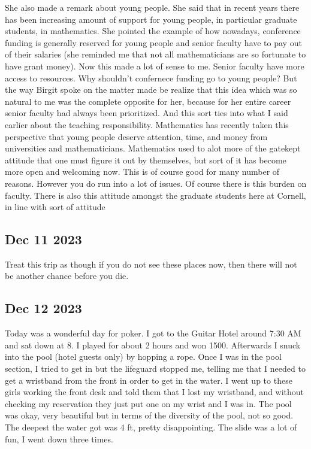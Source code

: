 \documentclass[12pt]{article}
\begin{document}
She also made a remark about young people. She said that in recent years there has been increasing amount of support for young people, in particular graduate students, in mathematics. She pointed the example
of how nowadays, conference funding is generally reserved for young people and senior faculty have to pay out of their salaries (she reminded me that not all mathematicians are so fortunate to have grant money).
Now this made a lot of sense to me. Senior faculty have more access to resources. Why shouldn't confernece funding go to young people? But the way Birgit spoke on the matter made be realize that this idea which
was so natural to me was the complete opposite for her, because for her entire career senior faculty had always been prioritized. And this sort ties into what I said earlier about the teaching responsibility.
Mathematics has recently taken this perspective that young people deserve attention, time, and money from universities and mathematicians. 
Mathematics used to alot more of the gatekept attitude that one must figure it out by themselves, but sort of it has become more open and welcoming now.
This is of course good for many number of reasons. However you do run into a lot of issues. Of course there is this burden on faculty. 
There is also this attitude amongst the graduate students here at Cornell, in line with sort of attitude
\subsection{Dec 11 2023}
Treat this trip as though if you do not see these places now, then there will not be 
another chance before you die.
\subsection{Dec 12 2023}
Today was a wonderful day for poker. I got to the Guitar Hotel around 7:30 AM and sat down at 8.
I played for about 2 hours and won 1500. Afterwards I snuck into the pool (hotel guests only) by hopping a rope.
Once I was in the pool section, I tried to get in but the lifeguard stopped me, telling me
that I needed to get a wristband from the front in order to get in the water. I went up to these girls
working the front desk and told them that I lost my wristband, and without checking my reservation
they just put one on my wrist and I was in. The pool was okay, very beautiful but in terms of the diversity of the pool, not so good.
The deepest the water got was 4 ft, pretty disappointing. The slide was a lot of fun, I went down three times.
\end{document}
